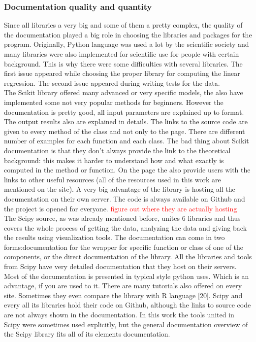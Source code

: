 \documentclass{article}
\begin{document}
\subsubsection{Documentation quality and quantity}
Since all libraries a very big and some of them a pretty complex, the quality of the documentation played a big role in choosing the libraries and packages for the program. Originally, Python language was used a lot by the scientific society and many libraries were also implemented for scientific use for people with certain background. This is why there were some difficulties with several libraries. The first issue appeared while choosing the proper library for computing the linear regression. The second issue appeared during writing tests for the data.\\
The Scikit library offered many advanced or very specific models, the also have implemented some not very popular methods for beginners. However the documentation is pretty good, all input parameters are explained up to format. The output results also are explained in details. The links to the source code are given to every method of the class and not only to the page. There are different number of examples for each function and each class. The bad thing about Scikit documentation is that they don't always provide the link to the theoretical background: this makes it harder to understand how and what exactly is computed in the method or function. On the page the also provide users with the links to other useful resources (all of the resources used in this work are mentioned on the site). A very big advantage of the library is hosting all the documentation on their own server. The code is always available on Github and the project is opened for everyone. \textcolor{red}{figure out where they are actually hosting}\\
The Scipy source, as was already mentioned before, unites 6 libraries and thus covers the whole process of getting the data, analyzing the data and giving back the results using visualization tools. The documentation can come in two forms:documentation for the wrapper for specific function or class of one of the components, or the direct documentation of the library. All the libraries and tools from Scipy have very detailed documentation that they host on their servers. Most of the documentation is presented in typical style python uses. Which is an advantage, if you are used to it. There are many tutorials also offered on every site. Sometimes they even compare the library with R language [20]. Scipy and every all its libraries hold their code on Github, although the links to source code are not always shown in the documentation. In this work the tools united in Scipy were sometimes used explicitly, but the general documentation overview of the Scipy library fits all of its elements documentation.\\
\end{document}
